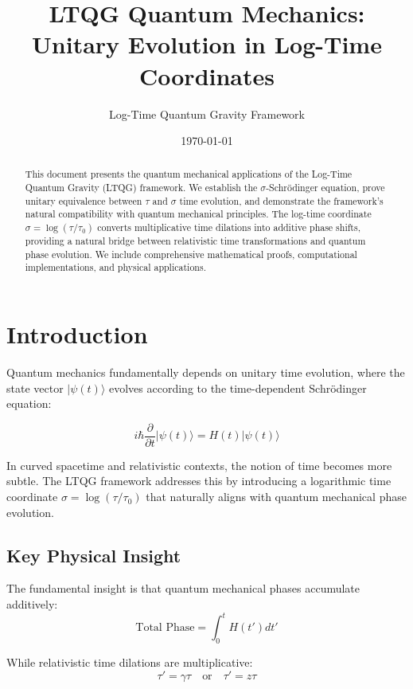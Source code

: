 \documentclass[11pt,a4paper]{article}
\title{\textbf{LTQG Quantum Mechanics:\\
Unitary Evolution in Log-Time Coordinates}}
\author{Log-Time Quantum Gravity Framework}
\date{\today}
\begin{document}
\maketitle

\begin{abstract}
This document presents the quantum mechanical applications of the Log-Time Quantum Gravity (LTQG) framework. We establish the $\sigma$-Schrödinger equation, prove unitary equivalence between $\tau$ and $\sigma$ time evolution, and demonstrate the framework's natural compatibility with quantum mechanical principles. The log-time coordinate $\sigma = \log(\tau/\tau_0)$ converts multiplicative time dilations into additive phase shifts, providing a natural bridge between relativistic time transformations and quantum phase evolution. We include comprehensive mathematical proofs, computational implementations, and physical applications.
\end{abstract}

\tableofcontents
\newpage

\section{Introduction}

Quantum mechanics fundamentally depends on unitary time evolution, where the state vector $|\psi(t)\rangle$ evolves according to the time-dependent Schrödinger equation:

\begin{equation}
i\hbar \frac{\partial}{\partial t} |\psi(t)\rangle = H(t) |\psi(t)\rangle
\end{equation}

In curved spacetime and relativistic contexts, the notion of time becomes more subtle. The LTQG framework addresses this by introducing a logarithmic time coordinate $\sigma = \log(\tau/\tau_0)$ that naturally aligns with quantum mechanical phase evolution.

\subsection{Key Physical Insight}

The fundamental insight is that quantum mechanical phases accumulate additively:
\begin{equation}
\text{Total Phase} = \int_0^t H(t') dt'
\end{equation}

While relativistic time dilations are multiplicative:
\begin{equation}
\tau' = \gamma \tau \quad \text{or} \quad \tau' = z \tau
\end{equation}
\end{document}
